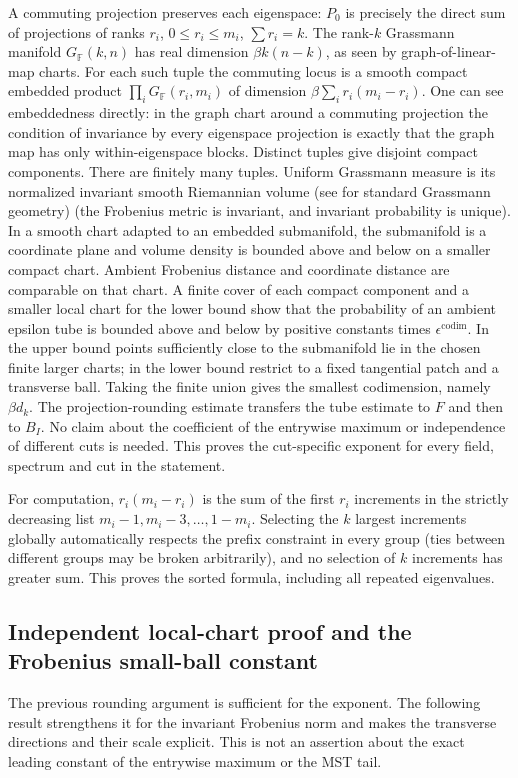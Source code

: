 \documentclass[11pt]{article}
\begin{document}
A commuting projection preserves each eigenspace: \(P_0\) is precisely the direct sum of projections of ranks \(r_i\), \(0\le r_i\le m_i\), \(\sum r_i=k\). The rank-\(k\) Grassmann manifold \(G_{\mathbb F}(k,n)\) has real dimension \(\beta k(n-k)\), as seen by graph-of-linear-map charts. For each such tuple the commuting locus is a smooth compact embedded product \(\prod_i G_{\mathbb F}(r_i,m_i)\) of dimension \(\beta\sum_i r_i(m_i-r_i)\). One can see embeddedness directly: in the graph chart around a commuting projection the condition of invariance by every eigenspace projection is exactly that the graph map has only within-eigenspace blocks. Distinct tuples give disjoint compact components. There are finitely many tuples. Uniform Grassmann measure is its normalized invariant smooth Riemannian volume (see \cite{Grassmann} for standard Grassmann geometry) (the Frobenius metric is invariant, and invariant probability is unique). In a smooth chart adapted to an embedded submanifold, the submanifold is a coordinate plane and volume density is bounded above and below on a smaller compact chart. Ambient Frobenius distance and coordinate distance are comparable on that chart. A finite cover of each compact component and a smaller local chart for the lower bound show that the probability of an ambient epsilon tube is bounded above and below by positive constants times \(\epsilon^{\mathrm{codim}}\). In the upper bound points sufficiently close to the submanifold lie in the chosen finite larger charts; in the lower bound restrict to a fixed tangential patch and a transverse ball. Taking the finite union gives the smallest codimension, namely \(\beta d_k\). The projection-rounding estimate transfers the tube estimate to \(F\) and then to \(B_I\). No claim about the coefficient of the entrywise maximum or independence of different cuts is needed. This proves the cut-specific exponent for every field, spectrum and cut in the statement.

For computation, \(r_i(m_i-r_i)\) is the sum of the first \(r_i\) increments in the strictly decreasing list \(m_i-1,m_i-3,\ldots,1-m_i\). Selecting the \(k\) largest increments globally automatically respects the prefix constraint in every group (ties between different groups may be broken arbitrarily), and no selection of \(k\) increments has greater sum. This proves the sorted formula, including all repeated eigenvalues.

\subsection{Independent local-chart proof and the Frobenius small-ball constant}
\label{sec:normal-chart}
The previous rounding argument is sufficient for the exponent. The following result strengthens it for the invariant Frobenius norm and makes the transverse directions and their scale explicit. This is not an assertion about the exact leading constant of the entrywise maximum or the MST tail.
\end{document}
